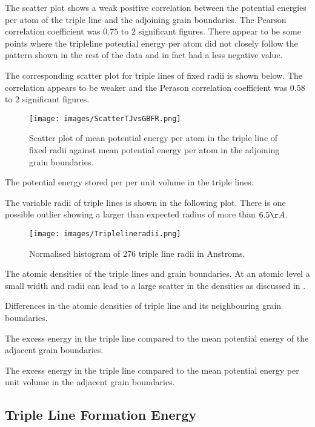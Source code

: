 \documentclass[12pt,a4paper]{book}
\begin{document}
The scatter plot shows a weak positive correlation between the potential energies per atom of the triple line and the adjoining grain boundaries. The Pearson correlation coefficient was $0.75$ to $2$ significant figures. There appear to be some points where the tripleline potential energy per atom did not closely follow the pattern shown in the rest of the data and in fact had a less negative value. 

The corresponding scatter plot for triple lines of fixed radii is shown below. The correlation appears to be weaker and the Perason correlation coefficient was $0.58$ to $2$ significant figures. 


\begin{figure}
	\texttt{[image: images/ScatterTJvsGBFR.png]} 
	\label{fig:ScatterTJvcGB}
	\caption{Scatter plot of mean potential energy per atom in the triple line of fixed radii against mean potential energy per atom in the adjoining grain boundaries.}
\end{figure}

The potential energy stored per per unit volume in the triple lines.

The variable radii of triple lines is shown in the following plot. There is one possible outlier showing a larger than expected radius of more than $6.5 \AA$. 

\begin{figure}
	\texttt{[image: images/Triplelineradii.png]}  
	\caption{Normalised histogram of 276 triple line radii in Anstroms.}	
	\label{fig:TJRadii}
\end{figure}	

The atomic densities of the triple lines and grain boundaries.
At an atomic level a small width and radii can lead to a large scatter in the densities as discussed in \cite{Kamachali2019}.  


Differences in the atomic densities of triple line and its neighbouring grain boundaries.

The excess energy in the triple line compared to the mean potential energy of the adjacent grain boundaries.

The excess energy in the triple line compared to the mean potential energy per unit volume in the adjacent grain boundaries. 



\subsection{Triple Line Formation Energy}
\end{document}

